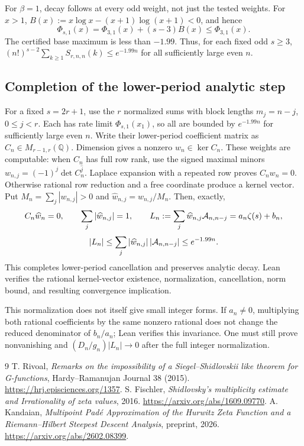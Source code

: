 \documentclass[11pt]{article}
\newcommand{\Q}{\mathbb Q}
\begin{document}
For $\beta=1$, decay follows at every odd weight, not just the tested
weights. For $x>1$, $B(x):=x\log x-(x+1)\log(x+1)<0$, and hence
\[
 \Phi_{s,1}(x)=\Phi_{3,1}(x)+(s-3)B(x)\le\Phi_{3,1}(x).
\]
The certified base maximum is less than $-1.99$. Thus, for each fixed
odd $s\ge3$, $(n!)^{s-2}\sum_{k\ge1}S_{r,n,n}(k)\le e^{-1.99n}$
for all sufficiently large even $n$.

\subsection{Completion of the lower-period analytic step}
For a fixed $s=2r+1$, use the $r$ normalized sums with block lengths
$m_j=n-j$, $0\le j<r$. Each has rate limit $\Phi_{s,1}(x_1)$, so
all are bounded by $e^{-1.99n}$ for sufficiently large even $n$.
Write their lower-period coefficient matrix as $C_n\in
M_{r-1,r}(\Q)$. Dimension gives a nonzero $w_n\in\ker C_n$.
These weights are computable: when $C_n$ has full row rank, use the
signed maximal minors $w_{n,j}=(-1)^j\det C_n^{\widehat j}$.
Laplace expansion with a repeated row proves $C_nw_n=0$.
Otherwise rational row reduction and a free coordinate produce a kernel vector.
Put $M_n=\sum_j|w_{n,j}|>0$ and $\widehat w_{n,j}=w_{n,j}/M_n$.
Then, exactly,
\[
 C_n\widehat w_n=0,\qquad
 \sum_j|\widehat w_{n,j}|=1,\qquad
 L_n:=\sum_j\widehat w_{n,j}{\cal A}_{n,n-j}
      =a_n\zeta(s)+b_n,
\]
\[
 |L_n|\le\sum_j|\widehat w_{n,j}|\,|{\cal A}_{n,n-j}|
       \le e^{-1.99n}.
\]
This completes lower-period cancellation and preserves analytic decay.
Lean verifies the rational kernel-vector existence, normalization,
cancellation, norm bound, and resulting convergence implication.

This normalization does not itself give small integer forms.
If $a_n\ne0$, multiplying both rational coefficients by the same nonzero
rational does not change the reduced denominator of $b_n/a_n$; Lean verifies
this invariance. One must still prove nonvanishing and
$(D_n/g_n)|L_n|\to0$ after the full integer normalization.

\begin{thebibliography}{9}
\small
{}
T. Rivoal, \emph{Remarks on the impossibility of a Siegel--Shidlovskii
like theorem for G-functions}, Hardy--Ramanujan Journal 38 (2015).
\url{https://hrj.episciences.org/1357}.
S. Fischler, \emph{Shidlovsky's multiplicity estimate and Irrationality
of zeta values}, 2016.
\url{https://arxiv.org/abs/1609.09770}.
A. Kandaian, \emph{Multipoint Pad\'e Approximation of the Hurwitz Zeta
Function and a Riemann--Hilbert Steepest Descent Analysis}, preprint, 2026.
\url{https://arxiv.org/abs/2602.08399}.
\end{thebibliography}
\end{document}
